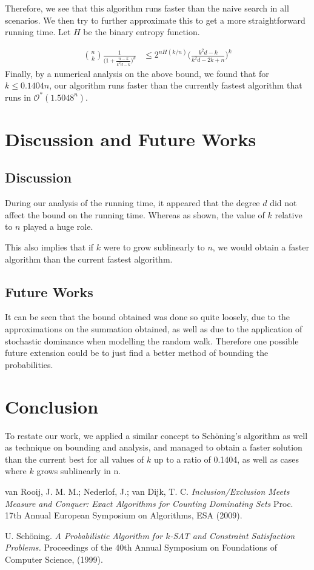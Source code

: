 \documentclass{article}
\begin{document}
Therefore, we see that this algorithm runs faster than the naive search in all scenarios. We then try to further approximate this to get a more straightforward running time. Let $H$ be the binary entropy function. \par
\begin{align*}
{n \choose k}\frac{1}{\Big(1 + \frac{n-k}{k^2d - k}\Big)^k} &\leq 2^{nH(k/n)} \Big(\frac{k^2d - k}{k^2d - 2k + n}\Big)^k 
\end{align*}
Finally, by a numerical analysis on the above bound, we found that for $k \leq 0.1404n$, our algorithm runs faster than the currently fastest algorithm that runs in $\mathcal{O}^*(1.5048^n)$\cite{Rooij}.

\section{Discussion and Future Works}
	\subsection{Discussion}
	During our analysis of the running time, it appeared that the degree $d$ did not affect the bound on the running time. Whereas as shown, the value of $k$ relative to $n$ played a huge role.\par
	
	This also implies that if $k$ were to grow sublinearly to $n$, we would obtain a faster algorithm than the current fastest algorithm.\par
	\subsection{Future Works}
	It can be seen that the bound obtained was done so quite loosely, due to the approximations on the summation obtained, as well as due to the application of stochastic dominance when modelling the random walk. Therefore one possible future extension could be to just find a better method of bounding the probabilities.\par
	
\section{Conclusion}	
	To restate our work, we applied a similar concept to Sch\"{o}ning's algorithm as well as technique on bounding and analysis, and managed to obtain a faster solution than the current best for all values of $k$ up to a ratio of 0.1404, as well as cases where $k$ grows sublinearly in n.\par


\begin{thebibliography}{9}
	van Rooij, J. M. M.; Nederlof, J.; van Dijk, T. C. \textit{Inclusion/Exclusion Meets Measure and Conquer: Exact Algorithms for Counting Dominating Sets}
	Proc. 17th Annual European Symposium on Algorithms, ESA (2009).
	
	
	U. Sch\"{o}ning.
	\textit{A Probabilistic Algorithm for $k$-SAT and Constraint Satisfaction Problems.} Proceedings of the 40th Annual Symposium on Foundations of Computer Science, (1999).
\end{thebibliography}
\end{document}
